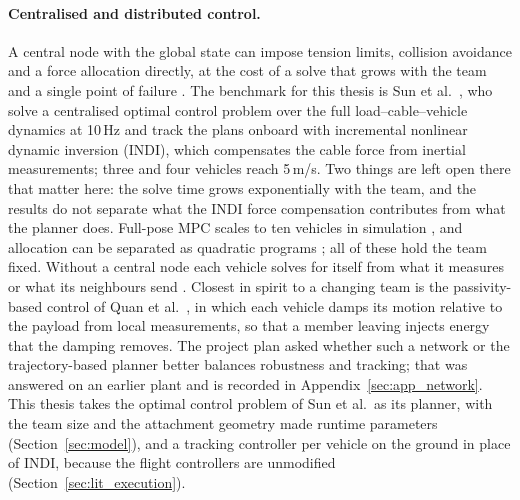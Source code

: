\paragraph{Centralised and distributed control.} A central node with the global state can impose tension limits,
collision avoidance and a force allocation directly, at the cost of a solve that grows with the team and a single point
of failure \cite{nathanReviewAutonomousMultiagent2011, dimakosStudyCentralisedDecentralised2021}. The benchmark for
this thesis is Sun et al.\ \cite{tudelft}, who solve a centralised optimal control problem over the full
load--cable--vehicle dynamics at 10\,Hz and track the plans onboard with incremental nonlinear dynamic inversion (INDI),
which compensates the cable force from inertial measurements; three and four vehicles reach 5\,m/s. Two things are left
open there that matter here: the solve time grows exponentially with the team, and the results do not separate what the
INDI force compensation contributes from what the planner does. Full-pose MPC scales to ten vehicles in simulation
\cite{sunNonlinearMPCFullPose2023}, and allocation can be separated as quadratic programs
\cite{efficient, vazquez-soquiSQPBasedCableTensionAllocation2026}; all of these hold the team fixed. Without a central
node each vehicle solves for itself from what it measures or what its neighbours send
\cite{scattoliniArchitecturesDistributedHierarchical2009, distributedNMPC, tasoojiEventTriggeredNonlinearModel}. Closest
in spirit to a changing team is the passivity-based control of Quan et al.\ \cite{quan2025swarm, liu2026passivity}, in
which each vehicle damps its motion relative to the payload from local measurements, so that a member leaving injects
energy that the damping removes. The project plan asked whether such a network or the trajectory-based planner better
balances robustness and tracking; that was answered on an earlier plant and is recorded in
Appendix~\ref{sec:app_network}. This thesis takes the optimal control problem of Sun et al.\ as its planner, with the
team size and the attachment geometry made runtime parameters (Section~\ref{sec:model}), and a tracking controller per
vehicle on the ground in place of INDI, because the flight controllers are unmodified (Section~\ref{sec:lit_execution}).
